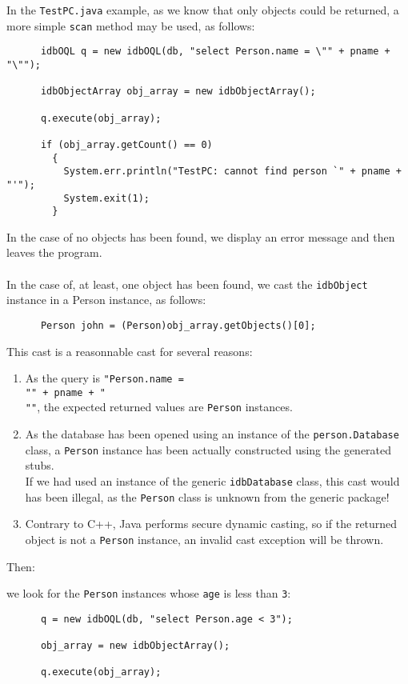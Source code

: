 In the \texttt{TestPC.java} example, as we know that only objects could
be returned, a more simple \texttt{scan} method may be used, as follows:
{\verbsize \begin{verbatim}
      idbOQL q = new idbOQL(db, "select Person.name = \"" + pname + "\"");

      idbObjectArray obj_array = new idbObjectArray();

      q.execute(obj_array);

      if (obj_array.getCount() == 0)
        {
          System.err.println("TestPC: cannot find person `" + pname + "'");
          System.exit(1);
        }
\end{verbatim}
}
In the case of no objects has been found, we display an error message and
then leaves the program.
\\
\\
In the case of, at least, one object has been found, we cast the \texttt{idbObject} instance in a Person instance, as follows:
{\verbsize \begin{verbatim}
      Person john = (Person)obj_array.getObjects()[0];
\end{verbatim}
}
This cast is a reasonnable cast for several reasons:
\begin{enumerate}
\item As the query is \texttt{"Person.name = \\"" + pname + "\\""}, the expected
returned values are \texttt{Person} instances.
\item As the database has been opened using an instance
of the \texttt{person.Database} class, a \texttt{Person} instance has been
actually constructed using the generated stubs.
\\
If we had used an instance of the generic \texttt{idbDatabase} class, this
cast would has been illegal, as the \texttt{Person} class is unknown from
the generic \eyedb package!
\item Contrary to C++, Java performs secure dynamic casting, so if the
returned object is not a \texttt{Person} instance, an invalid cast exception
will be thrown.
\end{enumerate}
Then:
\bi
\item we look for the \texttt{Person} instances whose \texttt{age} is less
than \texttt{3}:
{\verbsize \begin{verbatim}
      q = new idbOQL(db, "select Person.age < 3");

      obj_array = new idbObjectArray();

      q.execute(obj_array);
\end{verbatim}
}

